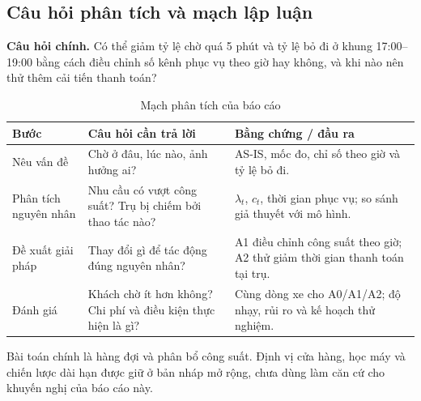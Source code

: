 \subsection{Câu hỏi phân tích và mạch lập luận}
\textbf{Câu hỏi chính.} Có thể giảm tỷ lệ chờ quá 5 phút và tỷ lệ bỏ đi ở
khung 17:00--19:00 bằng cách điều chỉnh số kênh phục vụ theo giờ hay không,
và khi nào nên thử thêm cải tiến thanh toán?
\begin{table}[H]\centering\small
\caption{Mạch phân tích của báo cáo}\label{r1:problems}
\begin{tabularx}{\linewidth}{@{}p{28mm}Y Y@{}}
\toprule
Bước & Câu hỏi cần trả lời & Bằng chứng / đầu ra \\
\midrule
Nêu vấn đề & Chờ ở đâu, lúc nào, ảnh hưởng ai? & AS-IS, mốc đo, chỉ số theo giờ và tỷ lệ bỏ đi. \\
Phân tích nguyên nhân & Nhu cầu có vượt công suất? Trụ bị chiếm bởi thao tác nào? & $\lambda_t$, $c_t$, thời gian phục vụ; so sánh giả thuyết với mô hình. \\
Đề xuất giải pháp & Thay đổi gì để tác động đúng nguyên nhân? & A1 điều chỉnh công suất theo giờ; A2 thử giảm thời gian thanh toán tại trụ. \\
Đánh giá & Khách chờ ít hơn không? Chi phí và điều kiện thực hiện là gì? & Cùng dòng xe cho A0/A1/A2; độ nhạy, rủi ro và kế hoạch thử nghiệm. \\
\bottomrule
\end{tabularx}
\end{table}
Bài toán chính là hàng đợi và phân bổ công suất. Định vị cửa hàng, học máy
và chiến lược dài hạn được giữ ở bản nháp mở rộng, chưa dùng làm căn cứ cho
khuyến nghị của báo cáo này.

